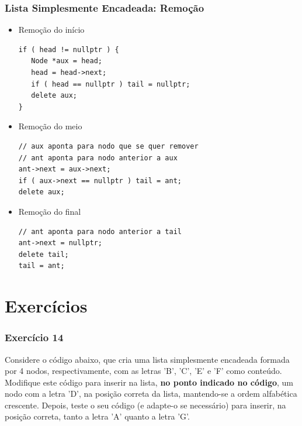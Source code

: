 \documentclass[aspectratio=169]{beamer}
\begin{document}
\begin{frame}[fragile]\frametitle{Lista Simplesmente Encadeada: Remoção}
\begin{itemize}
	\item Remoção do início
\begin{lstlisting}[basicstyle=\ttfamily\tiny]
if ( head != nullptr ) {
   Node *aux = head;
   head = head->next;
   if ( head == nullptr ) tail = nullptr;
   delete aux;
}
\end{lstlisting}
	\item Remoção do meio
\begin{lstlisting}[basicstyle=\ttfamily\tiny]
// aux aponta para nodo que se quer remover
// ant aponta para nodo anterior a aux
ant->next = aux->next;
if ( aux->next == nullptr ) tail = ant;
delete aux;
\end{lstlisting}
	\item Remoção do final
\begin{lstlisting}[basicstyle=\ttfamily\tiny]
// ant aponta para nodo anterior a tail
ant->next = nullptr;
delete tail;
tail = ant;
\end{lstlisting}
\end{itemize}
\end{frame}

\section{Exercícios}

\begin{frame}[fragile]\frametitle{Exercício 14}
\begin{enumerate}
{\footnotesize
	\setcounter{enumi}{13}
	\item Considere o código abaixo, que cria uma lista simplesmente encadeada formada por 4 nodos, respectivamente, com as letras 'B', 'C', 'E' e 'F' como conteúdo. Modifique este código para inserir na lista, \textbf{no ponto indicado no código}, um nodo com a letra 'D', na posição correta da lista, mantendo-se a ordem alfabética crescente. Depois, teste o seu código (e adapte-o se necessário) para inserir, na posição correta, tanto a letra 'A' quanto a letra 'G'.\\

\fontsize{5pt}{5pt}\selectfont{

}
}
\end{enumerate}
\end{frame}
\end{document}
